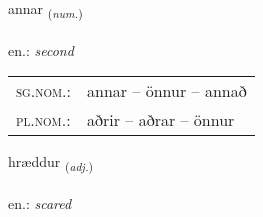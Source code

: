 \documentclass[frontgrid, backgrid]{flacards}\usepackage[]{graphicx}\usepackage[]{xcolor}
\begin{document}
\renewcommand{\flhead}{\vskip5pt \fboxsep=0pt {\small\bfseries\footnotesize Töluorð | Numeral}}
\renewcommand{\fcfoot}{\vskip5pt \fboxsep=0pt \hspace{2pt}{\small\bfseries\footnotesize 2K}}

\renewcommand{\blhead}{\vskip5pt {\small\bfseries\footnotesize Töluorð | Numeral }}
\renewcommand{\bcfoot}{\vskip5pt \hspace{2pt}{\small\bfseries\footnotesize 2K}}


{annar \small{\textsubscript{(\textit{num.})}} \\[1ex] %
\textphonetic{[anar]} \\
en.: \emph{second} \\  [2ex]
\renewcommand*{\arraystretch}{0.8}
\begin{tabular}{ll}
\textsc{sg.nom.}: & annar  --  önnur -- annað \\ 
\textsc{pl.nom.}: & aðrir -- aðrar -- önnur
\end{tabular}
}

\renewcommand{\flhead}{\vskip5pt \fboxsep=0pt {\small\bfseries\footnotesize Lýsingarorð | Adjective}}
\renewcommand{\fcfoot}{\vskip5pt \fboxsep=0pt \hspace{2pt}{\small\bfseries\footnotesize 2K}}

\renewcommand{\blhead}{\vskip5pt {\small\bfseries\footnotesize Lýsingarorð | Adjective }}
\renewcommand{\bcfoot}{\vskip5pt \hspace{2pt}{\small\bfseries\footnotesize 2K}}


{hræddur \small{\textsubscript{(\textit{adj.})}} \\[1ex] %
\textphonetic{[r̥aitʏr]} \\
en.: \emph{scared} \\  [2ex]
\renewcommand*{\arraystretch}{0.8}
}
\end{document}

